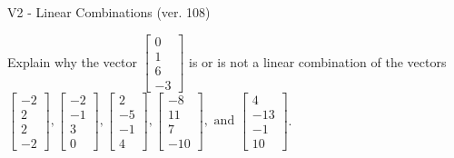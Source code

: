 \begin{exercise}
  \begin{exerciseTitle}V2 - Linear Combinations (ver. 108)\end{exerciseTitle}
  \begin{exerciseStatement}
    Explain why the vector \(\left[\begin{array}{c}
0 \\
1 \\
6 \\
-3
\end{array}\right]\)  is or is not a linear 
	combination of the vectors \(\left[\begin{array}{c}
-2 \\
2 \\
2 \\
-2
\end{array}\right] , \left[\begin{array}{c}
-2 \\
-1 \\
3 \\
0
\end{array}\right] , \left[\begin{array}{c}
2 \\
-5 \\
-1 \\
4
\end{array}\right] , \left[\begin{array}{c}
-8 \\
11 \\
7 \\
-10
\end{array}\right] , \text{ and } \left[\begin{array}{c}
4 \\
-13 \\
-1 \\
10
\end{array}\right]\).
	



\end{exerciseStatement}
\end{exercise}
